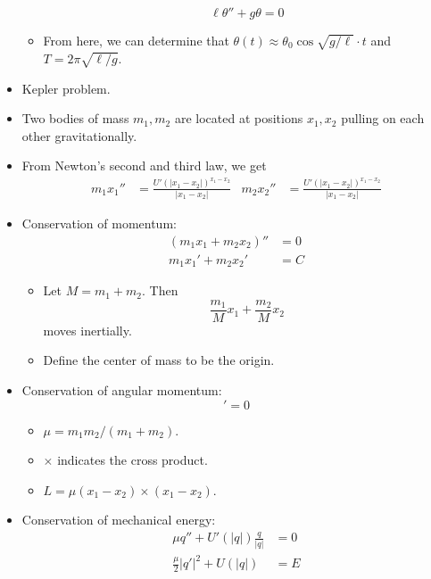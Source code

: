 \documentclass[../notes.tex]{subfiles}
\begin{document}
\begin{itemize}
\begin{itemize}
        \begin{equation*}
            \ell\theta''+g\theta = 0
        \end{equation*}
        \item From here, we can determine that $\theta(t)\approx\theta_0\cos\sqrt{g/\ell}\cdot t$ and $T=2\pi\sqrt{\ell/g}$.
    \end{itemize}
    \item Kepler problem.
    \item Two bodies of mass $m_1,m_2$ are located at positions $x_1,x_2$ pulling on each other gravitationally.
    \item From Newton's second and third law, we get
    \begin{align*}
        m_1x_1'' &= \frac{U'(|x_1-x_2|)^{x_1-x_2}}{|x_1-x_2|}&
        m_2x_2'' &= \frac{U'(|x_1-x_2|)^{x_1-x_2}}{|x_1-x_2|}
    \end{align*}
    \item Conservation of momentum:
    \begin{align*}
        (m_1x_1+m_2x_2)'' &= 0\\
        m_1x_1'+m_2x_2' &= C
    \end{align*}
    \begin{itemize}
        \item Let $M=m_1+m_2$. Then
        \begin{equation*}
            \frac{m_1}{M}x_1+\frac{m_2}{M}x_2
        \end{equation*}
        moves inertially.
        \item Define the center of mass to be the origin.
    \end{itemize}
    \item Conservation of angular momentum:
    \begin{equation*}
        [\mu(x_1-x_2)'\times(x_1-x_2)]' = 0
    \end{equation*}
    \begin{itemize}
        \item $\mu=m_1m_2/(m_1+m_2)$.
        \item $\times$ indicates the cross product.
        \item $L=\mu(x_1-x_2)\times(x_1-x_2)$.
    \end{itemize}
    \item Conservation of mechanical energy:
    \begin{align*}
        \mu q''+U'(|q|)\frac{q}{|q|} &= 0\\
        \frac{\mu}{2}|q'|^2+U(|q|) &= E

\end{align*}
\end{itemize}
\end{document}
